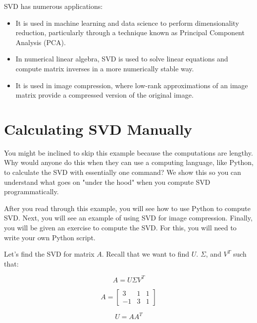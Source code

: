 SVD has numerous applications:
\begin{itemize}
\item It is used in machine learning and data science to perform
  dimensionality reduction, particularly through a technique known as
  Principal Component Analysis (PCA).
\item In numerical linear algebra, SVD is used to solve linear
  equations and compute matrix inverses in a more numerically stable
  way.
\item It is used in image compression, where low-rank approximations of an image matrix provide a compressed version of the original image. 
\end{itemize}

\section{Calculating SVD Manually}
You might be inclined to skip this example because the computations are lengthy. Why would anyone do this when they can use a computing language, like Python, to calculate the SVD with essentially one command? We show this so you can understand what goes on "under the hood" when you compute SVD programmatically. 

After you read through this example, you will see how to use Python to compute SVD. Next, you will see an example of using SVD for image compression. Finally, you will be given an exercise to compute the SVD. For this, you will need to write your own Python script.

Let's find the SVD for matrix $A$. Recall that we want to find $U$. $\Sigma$, and $V^T$ such that:

\begin{equation}
A = U \Sigma V^T
\end{equation}

$$ A = \begin{bmatrix}
3 & 1 & 1  \\
 -1 & 3 & 1 
\end{bmatrix}$$

$$U = AA^T$$ 

